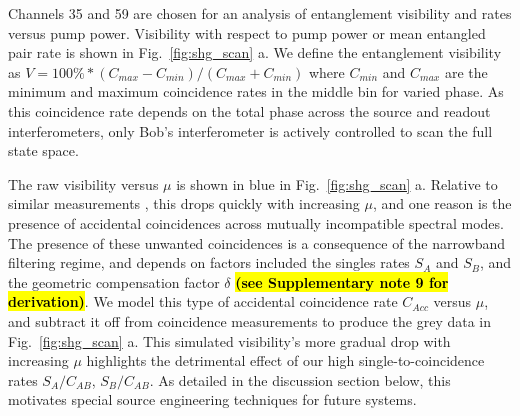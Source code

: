 \documentclass[11pt]{caltech_thesis} %
\begin{document}
Channels 35 and 59 are chosen for an analysis of entanglement visibility and rates versus pump power. Visibility with respect to pump power or mean entangled pair rate is shown in Fig.~\ref{fig:shg_scan} a. We define the entanglement visibility as $V = 100\%*(C_{max} - C_{min})/(C_{max} + C_{min})$ where $C_{min}$ and $C_{max}$ are the minimum and maximum coincidence rates in the middle bin for varied phase. As this coincidence rate depends on the total phase across the source and readout interferometers, only Bob's interferometer is actively controlled to scan the full state space.

The raw visibility versus $\mu$ is shown in blue in Fig.~\ref{fig:shg_scan} a. Relative to similar measurements \autocite{Kim2022}, this drops quickly with increasing $\mu$, and one reason is the presence of accidental coincidences across mutually incompatible spectral modes. The presence of these unwanted coincidences is a consequence of the narrowband filtering regime, and depends on factors included the singles rates $S_A$ and $S_B$, and the geometric compensation factor $\delta$ \textbf{\hl{(see Supplementary note 9 for derivation)}}. We model this type of accidental coincidence rate $C_{Acc}$ versus $\mu$, and subtract it off from coincidence measurements to produce the grey data in Fig.~\ref{fig:shg_scan} a. This simulated visibility's more gradual drop with increasing $\mu$ highlights the detrimental effect of our high single-to-coincidence rates $S_A/C_{AB}$, $S_B/C_{AB}$. As detailed in the discussion section below, this motivates special source engineering techniques for future systems.
\end{document}
